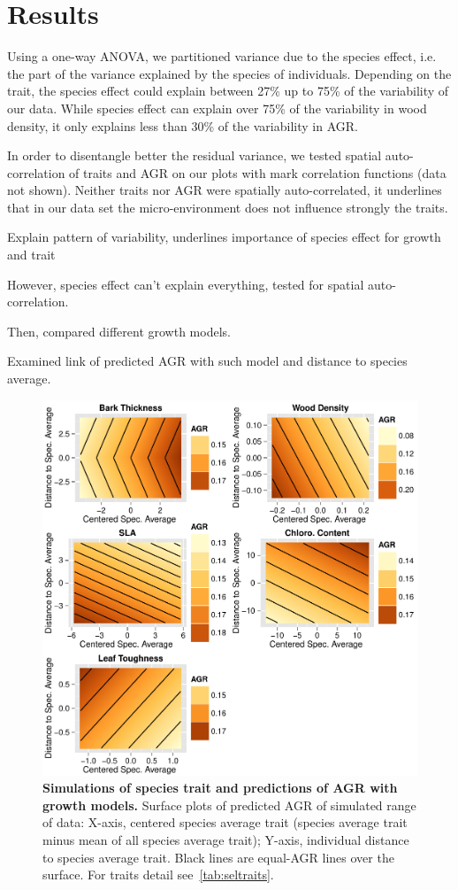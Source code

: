 \label{sec:Res}
\section*{Results}

Using a one-way ANOVA, we partitioned variance due to the species effect, i.e. the part of the variance explained by the species of individuals. Depending on the trait, the species effect could explain between 27\% up to 75\% of the variability of our data. While species effect can explain over 75\% of the variability in wood density, it only explains less than 30\% of the variability in AGR.

In order to disentangle better the residual variance, we tested spatial auto-correlation of traits and AGR on our plots with mark correlation functions (data not shown). Neither traits nor AGR were spatially auto-correlated, it underlines that in our data set the micro-environment does not influence strongly the traits.

Explain pattern of variability, underlines importance of species effect for growth and trait \missfig

However, species effect can't explain everything, tested for spatial auto-correlation.

Then, compared different growth models.

Examined link of predicted AGR with such model and distance to species average.

\begin{figure}[h!]
	\centering
	\includegraphics{figures/Sel_Traits_Simul_Pred_AGR_2015-05-22.pdf}
	\caption{\textbf{Simulations of species trait and predictions of AGR with growth models.} Surface plots of predicted AGR of simulated range of data: X-axis, centered species average trait (species average trait minus mean of all species average trait); Y-axis, individual distance to species average trait. Black lines are equal-AGR lines over the surface. For traits detail see~\autoref{tab:seltraits}.}
	\label{fig:simul}
\end{figure}